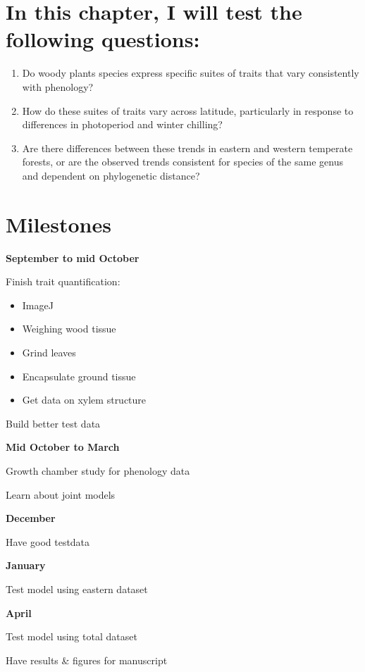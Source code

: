 \documentclass{article}\usepackage[]{graphicx}\usepackage[]{color}
\begin{document}
\section*{In this chapter, I will test the following questions:}
\begin{enumerate}
\item Do woody plants species express specific suites of traits that vary consistently with phenology? 
\item How do these suites of traits vary across latitude, particularly in response to differences in photoperiod and winter chilling?
\item Are there differences between these trends in eastern and western temperate forests, or are the observed trends consistent for species of the same genus and dependent on phylogenetic distance?

\end{enumerate}
\par %


\section*{Milestones}

\textbf{September to mid October}
\par Finish trait quantification:
\begin{itemize}
\item ImageJ
\item Weighing wood tissue
\item Grind leaves
\item Encapsulate ground tissue
\item Get data on xylem structure 
\end{itemize}
\par Build better test data

\textbf{Mid October to March}
\par Growth chamber study for phenology data
\par Learn about joint models

\textbf{December}
\par Have good testdata

\textbf{January}
\par Test model using eastern dataset

\textbf{April}
\par Test model using total dataset

\par Have results & figures for manuscript

% 


\end{document}
